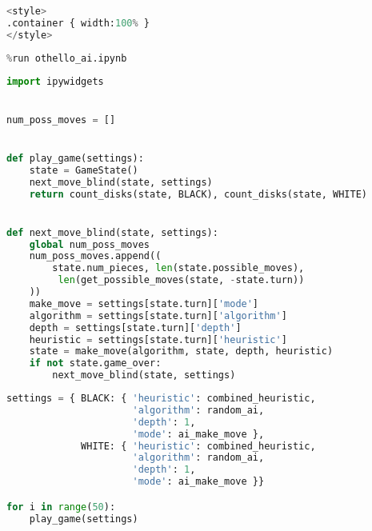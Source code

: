 \begin{lstlisting}[language=Python]
%%HTML
<style>
.container { width:100% }
</style>
\end{lstlisting}

\begin{lstlisting}[language=Python]
%run othello_game.ipynb
%run othello_ai.ipynb
\end{lstlisting}

\begin{lstlisting}[language=Python]
import ipywidgets


num_poss_moves = []


def play_game(settings):
    state = GameState()
    next_move_blind(state, settings)
    return count_disks(state, BLACK), count_disks(state, WHITE)


def next_move_blind(state, settings):
    global num_poss_moves
    num_poss_moves.append((
        state.num_pieces, len(state.possible_moves),
         len(get_possible_moves(state, -state.turn))
    ))
    make_move = settings[state.turn]['mode']
    algorithm = settings[state.turn]['algorithm']
    depth = settings[state.turn]['depth']
    heuristic = settings[state.turn]['heuristic']
    state = make_move(algorithm, state, depth, heuristic)
    if not state.game_over:
        next_move_blind(state, settings)
\end{lstlisting}

\begin{lstlisting}[language=Python]
settings = { BLACK: { 'heuristic': combined_heuristic,
                      'algorithm': random_ai,
                      'depth': 1,
                      'mode': ai_make_move },
             WHITE: { 'heuristic': combined_heuristic,
                      'algorithm': random_ai,
                      'depth': 1,
                      'mode': ai_make_move }}

for i in range(50):
    play_game(settings)
\end{lstlisting}

